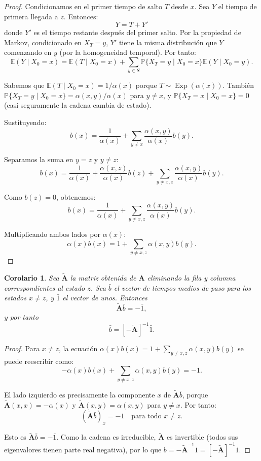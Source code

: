 \documentclass{article}
\theoremstyle{plain}
\newtheorem{Corolario}[Teorema]{Corolario}
\theoremstyle{definition}
\newcommand{\E}{\mathbb{E}}
\newcommand{\Prob}{\mathbb{P}}
\newcommand{\A}{\mathbf{A}}
\begin{document}
\begin{proof}
  Condicionamos en el primer tiempo de salto $T$ desde $x$. Sea $Y$ el tiempo de primera llegada a $z$. Entonces:
  \[ Y = T + Y' \]
  donde $Y'$ es el tiempo restante despu\'es del primer salto. Por la propiedad de Markov, condicionado en $X_T = y$, $Y'$ tiene la misma distribuci\'on que $Y$ comenzando en $y$ (por la homogeneidad temporal). Por tanto:
  \[ \E(Y \mid X_0 = x) = \E(T \mid X_0 = x) + \sum_{y \in S} \Prob\{X_T = y \mid X_0 = x\} \E(Y \mid X_0 = y). \]

  Sabemos que $\E(T \mid X_0 = x) = 1/\alpha(x)$ porque $T \sim \operatorname{Exp}(\alpha(x))$. Tambi\'en $\Prob\{X_T = y \mid X_0 = x\} = \alpha(x,y)/\alpha(x)$ para $y \neq x$, y $\Prob\{X_T = x \mid X_0 = x\} = 0$ (casi seguramente la cadena cambia de estado).

  Sustituyendo:
  \[ b(x) = \frac{1}{\alpha(x)} + \sum_{y \neq x} \frac{\alpha(x,y)}{\alpha(x)} b(y). \]

  Separamos la suma en $y = z$ y $y \neq z$:
  \[ b(x) = \frac{1}{\alpha(x)} + \frac{\alpha(x,z)}{\alpha(x)} b(z) + \sum_{y \neq x, z} \frac{\alpha(x,y)}{\alpha(x)} b(y). \]

  Como $b(z) = 0$, obtenemos:
  \[ b(x) = \frac{1}{\alpha(x)} + \sum_{y \neq x, z} \frac{\alpha(x,y)}{\alpha(x)} b(y). \]

  Multiplicando ambos lados por $\alpha(x)$:
  \[ \alpha(x) b(x) = 1 + \sum_{y \neq x, z} \alpha(x,y) b(y). \]
\end{proof}

\begin{Corolario}
  Sea $\tilde{\A}$ la matriz obtenida de $\A$ eliminando la fila y columna correspondientes al estado $z$. Sea $\bar{b}$ el vector de tiempos medios de paso para los estados $x \neq z$, y $\bar{1}$ el vector de unos. Entonces
  \[ \tilde{\A} \bar{b} = -\bar{1}, \]
  y por tanto
  \[ \bar{b} = [-\tilde{\A}]^{-1} \bar{1}. \]
\end{Corolario}

\begin{proof}
  Para $x \neq z$, la ecuaci\'on $\alpha(x) b(x) = 1 + \sum_{y \neq x, z} \alpha(x,y) b(y)$ se puede reescribir como:
  \[ -\alpha(x) b(x) + \sum_{y \neq x, z} \alpha(x,y) b(y) = -1. \]

  El lado izquierdo es precisamente la componente $x$ de $\tilde{\A} \bar{b}$, porque $\tilde{\A}(x,x) = -\alpha(x)$ y $\tilde{\A}(x,y) = \alpha(x,y)$ para $y \neq x$. Por tanto:
  \[ (\tilde{\A} \bar{b})_x = -1 \quad \text{para todo } x \neq z. \]

  Esto es $\tilde{\A} \bar{b} = -\bar{1}$. Como la cadena es irreducible, $\tilde{\A}$ es invertible (todos sus eigenvalores tienen parte real negativa), por lo que $\bar{b} = -\tilde{\A}^{-1}\bar{1} = [-\tilde{\A}]^{-1}\bar{1}$.
\end{proof}
\end{document}
